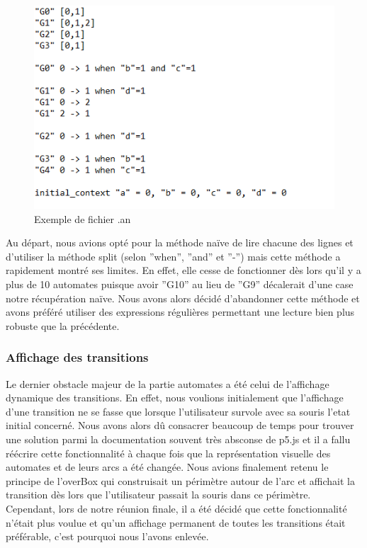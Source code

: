 \begin{figure}[!h]
  \centering
\includegraphics[scale = .7]{images/fichier_an.png} 
\caption{Exemple de fichier .an}
\end{figure}
Au départ, nous avions opté pour la méthode naïve de lire chacune des lignes et d’utiliser la méthode split (selon ”when”, ”and” et ”-”) mais cette méthode a rapidement montré ses limites. En effet, elle cesse de fonctionner dès lors qu’il y a plus de 10 automates puisque avoir ”G10” au lieu de ”G9” décalerait d’une case notre récupération naïve.
Nous avons alors décidé d’abandonner cette méthode et avons préféré utiliser des expressions régulières permettant une lecture bien plus robuste que la précédente.

\bigbreak
\subsubsection{Affichage des transitions}

Le dernier obstacle majeur de la partie automates a été celui de l’affichage dynamique des transitions. En effet, nous voulions initialement que l’affichage d’une transition ne se fasse que lorsque l’utilisateur survole avec sa souris l'etat initial concerné. Nous avons alors dû consacrer beaucoup de temps pour trouver une solution parmi la documentation souvent très absconse de p5.js et il a fallu réécrire cette fonctionnalité à chaque fois que la représentation visuelle des automates et de leurs arcs a été changée. Nous avions finalement retenu le principe de l’overBox qui construisait un périmètre autour de l’arc et affichait la transition dès lors que l’utilisateur passait la souris dans ce périmètre. Cependant, lors de notre réunion finale, il a été décidé que cette fonctionnalité n’était plus voulue et qu’un affichage permanent de toutes les transitions était préférable, c’est pourquoi nous l’avons enlevée.

